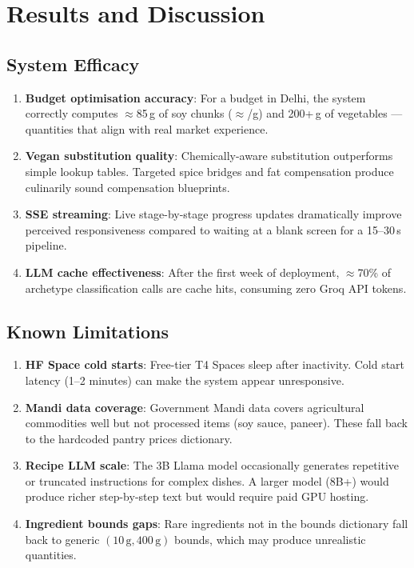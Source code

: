 \documentclass[12pt, a4paper]{article}
\begin{document}
\section{Results and Discussion}

\subsection{System Efficacy}

\begin{enumerate}
  \item \textbf{Budget optimisation accuracy}: For a  budget in Delhi, the system correctly computes $\approx$85\,g of soy chunks ($\approx$/g) and 200+\,g of vegetables --- quantities that align with real market experience.
  \item \textbf{Vegan substitution quality}: Chemically-aware substitution outperforms simple lookup tables.  Targeted spice bridges and fat compensation produce culinarily sound compensation blueprints.
  \item \textbf{SSE streaming}: Live stage-by-stage progress updates dramatically improve perceived responsiveness compared to waiting at a blank screen for a 15--30\,s pipeline.
  \item \textbf{LLM cache effectiveness}: After the first week of deployment, $\approx$70\% of archetype classification calls are cache hits, consuming zero Groq API tokens.
\end{enumerate}

\subsection{Known Limitations}

\begin{enumerate}
  \item \textbf{HF Space cold starts}: Free-tier T4 Spaces sleep after inactivity.  Cold start latency (1--2 minutes) can make the system appear unresponsive.
  \item \textbf{Mandi data coverage}: Government Mandi data covers agricultural commodities well but not processed items (soy sauce, paneer).  These fall back to the hardcoded pantry prices dictionary.
  \item \textbf{Recipe LLM scale}: The 3B Llama model occasionally generates repetitive or truncated instructions for complex dishes.  A larger model (8B+) would produce richer step-by-step text but would require paid GPU hosting.
  \item \textbf{Ingredient bounds gaps}: Rare ingredients not in the bounds dictionary fall back to generic $(10\,\text{g}, 400\,\text{g})$ bounds, which may produce unrealistic quantities.
\end{enumerate}
\end{document}
